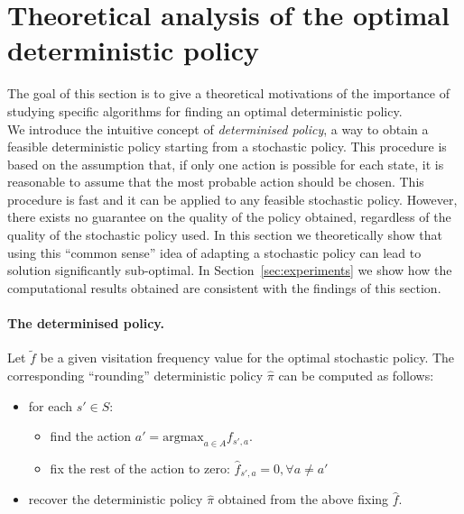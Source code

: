 \section{Theoretical analysis of the optimal deterministic policy}\label{sec:comparison}

%

The goal of this section is to give a theoretical motivations of the importance of studying specific algorithms for finding an optimal deterministic policy. \\
We introduce the intuitive concept of \emph{determinised policy}, a way to obtain a feasible deterministic policy starting from a stochastic policy. This procedure is based on the assumption that, if only one action is possible for each state, it is reasonable to assume that the most probable action should be chosen. This procedure is fast and it can be applied to any feasible stochastic policy. However, there exists no guarantee on the quality of the policy obtained, regardless of the quality of the stochastic policy used. In this section we theoretically show that using this ``common sense'' idea of adapting a stochastic policy can lead to solution significantly sub-optimal. In Section~\ref{sec:experiments} we show how the computational results obtained are consistent with the findings of this section.

\paragraph{\textbf{The determinised policy.}}%

Let $\tilde{f}$ be a given visitation frequency value for the optimal stochastic policy. The corresponding ``rounding'' deterministic policy $\hat{\pi}$ can be computed as follows:

\begin{itemize}
\item for each $s'\in S$:
\begin{itemize}
\item find the action $a' = \text{argmax}_{a \in A}f_{s',a}$.
\item fix the rest of the action to zero: $\hat{f}_{s',a} =0, \forall a \neq a'$
\end{itemize}
\item recover the deterministic policy $\hat{\pi}$ obtained from the above fixing $\hat{f}$.
\end{itemize} 
 
